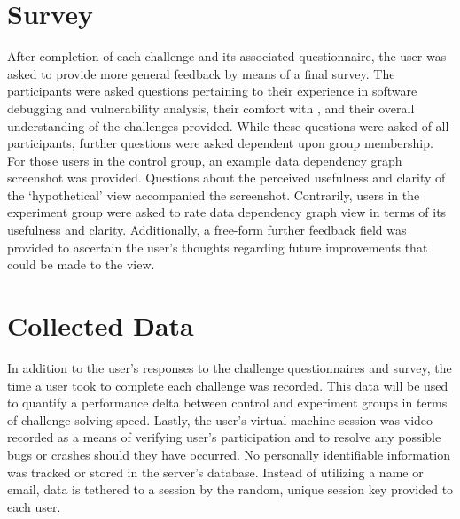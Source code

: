 \section{Survey}
After completion of each challenge and its associated questionnaire, the user was asked to provide more general feedback by means of a final survey. The participants were asked questions pertaining to their experience in software debugging and vulnerability analysis, their comfort with , and their overall understanding of the challenges provided. While these questions were asked of all participants, further questions were asked dependent upon group membership. For those users in the control group, an example data dependency graph screenshot was provided. Questions about the perceived usefulness and clarity of the ‘hypothetical’ view accompanied the screenshot. Contrarily, users in the experiment group were asked to rate data dependency graph view in terms of its usefulness and clarity. Additionally, a free-form further feedback field was provided to ascertain the user’s thoughts regarding future improvements that could be made to the view.

\section{Collected Data}
In addition to the user’s responses to the challenge questionnaires and survey, the time a user took to complete each challenge was recorded. This data will be used to quantify a performance delta between control and experiment groups in terms of challenge-solving speed. Lastly, the user’s virtual machine session was video recorded as a means of verifying user’s participation and to resolve any possible bugs or crashes should they have occurred. No personally identifiable information was tracked or stored in the server’s database. Instead of utilizing a name or email, data is tethered to a session by the random, unique session key provided to each user.  